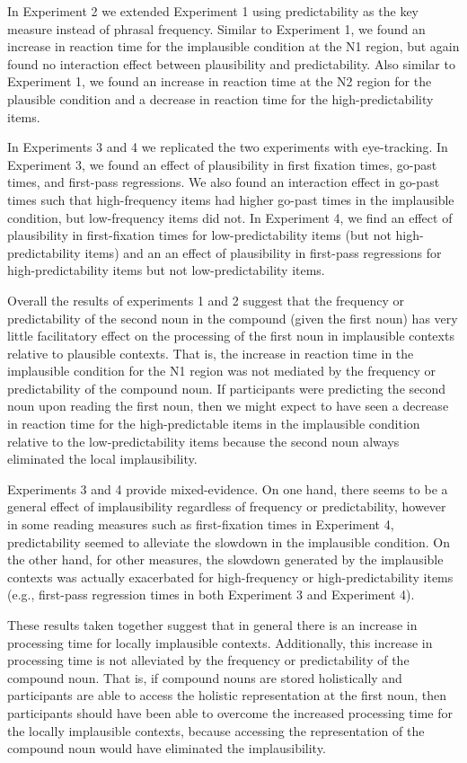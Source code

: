\documentclass[
  12pt,
  letterpaper,
]{scrreport}
\begin{document}
In Experiment 2 we extended Experiment 1 using predictability as the key
measure instead of phrasal frequency. Similar to Experiment 1, we found
an increase in reaction time for the implausible condition at the N1
region, but again found no interaction effect between plausibility and
predictability. Also similar to Experiment 1, we found an increase in
reaction time at the N2 region for the plausible condition and a
decrease in reaction time for the high-predictability items.

In Experiments 3 and 4 we replicated the two experiments with
eye-tracking. In Experiment 3, we found an effect of plausibility in
first fixation times, go-past times, and first-pass regressions. We also
found an interaction effect in go-past times such that high-frequency
items had higher go-past times in the implausible condition, but
low-frequency items did not. In Experiment 4, we find an effect of
plausibility in first-fixation times for low-predictability items (but
not high-predictability items) and an an effect of plausibility in
first-pass regressions for high-predictability items but not
low-predictability items.

Overall the results of experiments 1 and 2 suggest that the frequency or
predictability of the second noun in the compound (given the first noun)
has very little facilitatory effect on the processing of the first noun
in implausible contexts relative to plausible contexts. That is, the
increase in reaction time in the implausible condition for the N1 region
was not mediated by the frequency or predictability of the compound
noun. If participants were predicting the second noun upon reading the
first noun, then we might expect to have seen a decrease in reaction
time for the high-predictable items in the implausible condition
relative to the low-predictability items because the second noun always
eliminated the local implausibility.

Experiments 3 and 4 provide mixed-evidence. On one hand, there seems to
be a general effect of implausibility regardless of frequency or
predictability, however in some reading measures such as first-fixation
times in Experiment 4, predictability seemed to alleviate the slowdown
in the implausible condition. On the other hand, for other measures, the
slowdown generated by the implausible contexts was actually exacerbated
for high-frequency or high-predictability items (e.g., first-pass
regression times in both Experiment 3 and Experiment 4).

These results taken together suggest that in general there is an
increase in processing time for locally implausible contexts.
Additionally, this increase in processing time is not alleviated by the
frequency or predictability of the compound noun. That is, if compound
nouns are stored holistically and participants are able to access the
holistic representation at the first noun, then participants should have
been able to overcome the increased processing time for the locally
implausible contexts, because accessing the representation of the
compound noun would have eliminated the implausibility.
\end{document}
